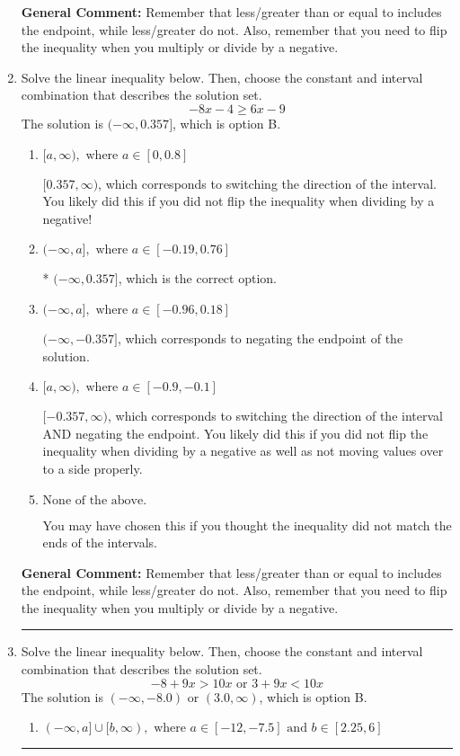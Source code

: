 \documentclass{extbook}[14pt]
\newcommand{\litem}[1]{\item #1

\rule{\textwidth}{0.4pt}}
\begin{document}
\begin{enumerate}
{\textbf{General Comment:} Remember that less/greater than or equal to includes the endpoint, while less/greater do not. Also, remember that you need to flip the inequality when you multiply or divide by a negative.
}
\litem{
Solve the linear inequality below. Then, choose the constant and interval combination that describes the solution set.
\[ -8x -4 \geq 6x -9 \]The solution is \( (-\infty, 0.357] \), which is option B.\begin{enumerate}[label=\Alph*.]
\item \( [a, \infty), \text{ where } a \in [0, 0.8] \)

 $[0.357, \infty)$, which corresponds to switching the direction of the interval. You likely did this if you did not flip the inequality when dividing by a negative!
\item \( (-\infty, a], \text{ where } a \in [-0.19, 0.76] \)

* $(-\infty, 0.357]$, which is the correct option.
\item \( (-\infty, a], \text{ where } a \in [-0.96, 0.18] \)

 $(-\infty, -0.357]$, which corresponds to negating the endpoint of the solution.
\item \( [a, \infty), \text{ where } a \in [-0.9, -0.1] \)

 $[-0.357, \infty)$, which corresponds to switching the direction of the interval AND negating the endpoint. You likely did this if you did not flip the inequality when dividing by a negative as well as not moving values over to a side properly.
\item \( \text{None of the above}. \)

You may have chosen this if you thought the inequality did not match the ends of the intervals.
\end{enumerate}

\textbf{General Comment:} Remember that less/greater than or equal to includes the endpoint, while less/greater do not. Also, remember that you need to flip the inequality when you multiply or divide by a negative.
}
\litem{
Solve the linear inequality below. Then, choose the constant and interval combination that describes the solution set.
\[ -8 + 9 x > 10 x \text{ or } 3 + 9 x < 10 x \]The solution is \( (-\infty, -8.0) \text{ or } (3.0, \infty) \), which is option B.\begin{enumerate}[label=\Alph*.]
\item \( (-\infty, a] \cup [b, \infty), \text{ where } a \in [-12, -7.5] \text{ and } b \in [2.25, 6] \)


\end{enumerate}}
\end{enumerate}
\end{document}
